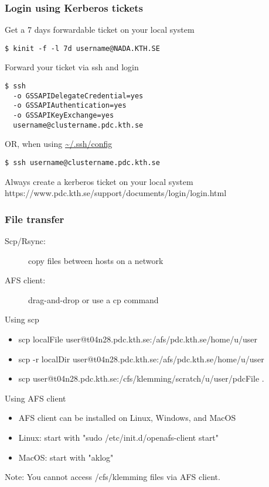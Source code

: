 \begin{frame}[fragile]
\frametitle{Login using Kerberos tickets}

\begin{block}{Get a 7 days forwardable ticket on your local system}
\begin{verbatim}
$ kinit -f -l 7d username@NADA.KTH.SE
\end{verbatim}
\end{block}

\begin{block}{Forward your ticket via ssh and login}
\begin{verbatim}
$ ssh
  -o GSSAPIDelegateCredential=yes
  -o GSSAPIAuthentication=yes
  -o GSSAPIKeyExchange=yes
  username@clustername.pdc.kth.se
\end{verbatim}
\end{block}

\begin{block}{OR, when using \url{~/.ssh/config}}
\begin{verbatim}
$ ssh username@clustername.pdc.kth.se
\end{verbatim}
\end{block}

\alert{Always create a kerberos ticket on your local system}
\alert{https://www.pdc.kth.se/support/documents/login/login.html}
\end{frame}


\begin{frame}[fragile]
\frametitle{File transfer}

\begin{description}
\item [Scp/Rsync:] copy files between hosts on a network
\item [AFS client:] drag-and-drop or use a cp command
\end{description}

\begin{alertblock}{Using scp}
\begin{itemize}
  \item scp localFile user@t04n28.pdc.kth.se:/afs/pdc.kth.se/home/u/user
  \item scp -r localDir user@t04n28.pdc.kth.se:/afs/pdc.kth.se/home/u/user
  \item scp user@t04n28.pdc.kth.se:/cfs/klemming/scratch/u/user/pdcFile .
\end{itemize}
\end{alertblock}

\begin{alertblock}{Using AFS client}
\begin{itemize}
  \item AFS client can be installed on Linux, Windows, and MacOS
  \item Linux: start with "sudo /etc/init.d/openafs-client start"
  \item MacOS: start with "aklog"
\end{itemize}
\end{alertblock}

\alert{Note: You cannot access /cfs/klemming files via AFS client.}

\end{frame}
